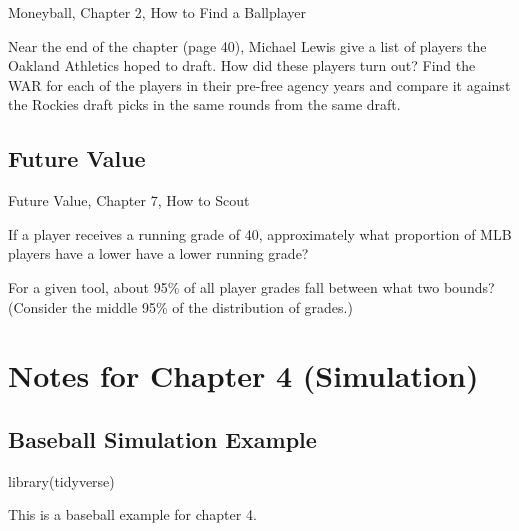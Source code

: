 \documentclass[
]{book}
\newenvironment{Shaded}{\begin{snugshade}}{\end{snugshade}}
\newcommand{\FunctionTok}[1]{\textcolor[rgb]{0.00,0.00,0.00}{#1}}
\newcommand{\NormalTok}[1]{#1}
\theoremstyle{definition}
\theoremstyle{definition}
\theoremstyle{definition}
\theoremstyle{definition}
\theoremstyle{remark}
\begin{document}
Moneyball, Chapter 2, How to Find a Ballplayer \citep{lewis2004moneyball}

Near the end of the chapter (page 40), Michael Lewis give a list of players the Oakland Athletics hoped to draft. How did these players turn out? Find the WAR for each of the players in their pre-free agency years and compare it against the Rockies draft picks in the same rounds from the same draft.

\hypertarget{future-value}{%
\subsection{Future Value}\label{future-value}}

Future Value, Chapter 7, How to Scout \citep{longenhagen2020future}

If a player receives a running grade of 40, approximately what proportion of MLB players have a lower have a lower running grade?

For a given tool, about 95\% of all player grades fall between what two bounds? (Consider the middle 95\% of the distribution of grades.)

\hypertarget{notes-for-chapter-4-simulation}{%
\section{Notes for Chapter 4 (Simulation)}\label{notes-for-chapter-4-simulation}}

\hypertarget{baseball-simulation-example}{%
\subsection{Baseball Simulation Example}\label{baseball-simulation-example}}

\begin{Shaded}
\begin{Highlighting}[]
\FunctionTok{library}\NormalTok{(tidyverse)}
\end{Highlighting}
\end{Shaded}

This is a baseball example for chapter 4.
\end{document}
